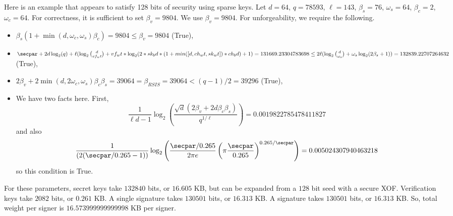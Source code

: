 \begin{example}
Here is an example that appears to satisfy 128 bits of security using sparse keys.
Let $d = 64$, $q = 78593$, $\ell = 143$, $\beta_s = 76$, $\omega_s = 64$, $\beta_c = 2$, $\omega_c = 64$.
For correctness, it is sufficient to set $\beta_v = 9804$. We use $\beta_v = 9804$.
For unforgeability, we require the following.
\begin{itemize}
\item $\beta_s(1+\min(d, \omega_c, \omega_s)\beta_c) = 9804\leq \beta_v = 9804$ (True),
\item $\secpar + 2d \log_2(q) + \ell (\log_2\binom{d}{vf_wt} + vf_wt*\log_2(2*sk_bd*(1+min([d, ch_wt, sk_wt])*ch_bd)+1)= 131669.23304783698\leq 2\ell (\log_2\binom{d}{\omega_s} + \omega_s \log_2(2\beta_s + 1)) = 132839.22707264632$ (True),
\item $2\beta_v + 2\min(d, 2\omega_c, \omega_s)\beta_c \beta_s = 39064 = \beta_{RSIS} = 39064< (q-1)/2 = 39296$ (True),
\item We have two facts here. First, \[\frac{1}{\ell d - 1}\log_2\left(\frac{\sqrt{d}(2\beta_v + 2d\beta_c \beta_s)}{q^{1/\ell}}\right) = 0.0019822785478411827\]and also \[\frac{1}{(2(\secpar/0.265 - 1))}\log_2\left(\frac{\secpar/0.265}{2\pi e}\left(\pi \frac{\secpar}{0.265}\right)^{0.265/\secpar}\right) = 0.005024307940463218\]so this condition is True.
\end{itemize}
For these parameters, secret keys take $132840$ bits, or $16.605$ KB, but can be expanded from a $128$ bit seed with a secure XOF.  Verification keys take $2082$ bits, or $0.261$ KB. A single signature takes $130501$ bits, or $16.313$ KB.  A signature takes $130501$ bits, or $16.313$ KB.  So, total weight per signer is $16.573999999999998$ KB per signer.
\end{example}

